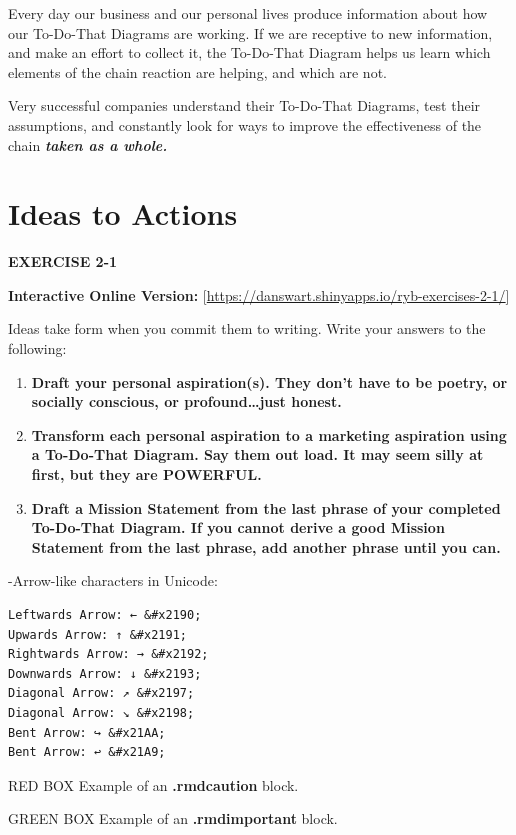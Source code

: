 \documentclass[
]{book}
\begin{document}
Every day our business and our personal lives produce information about how our To-Do-That Diagrams are working. If we are receptive to new information, and make an effort to collect it, the To-Do-That Diagram helps us learn which elements of the chain reaction are helping, and which are not.

Very successful companies understand their To-Do-That Diagrams, test their assumptions, and constantly look for ways to improve the effectiveness of the chain \textbf{\emph{taken as a whole.}}

\hypertarget{ideas-to-actions-1}{%
\section{Ideas to Actions}\label{ideas-to-actions-1}}

\textbf{EXERCISE 2-1}

{\textbf{Interactive Online Version:}} {[}\url{https://danswart.shinyapps.io/ryb-exercises-2-1/}{]}

Ideas take form when you commit them to writing. Write your answers to the following:

\begin{enumerate}
\def\labelenumi{\arabic{enumi}.}
\item
  \textbf{Draft your personal aspiration(s). They don't have to be poetry, or socially conscious, or profound\ldots just honest.}
\item
  \textbf{Transform each personal aspiration to a marketing aspiration using a To-Do-That Diagram. Say them out load. It may seem silly at first, but they are POWERFUL.}
\item
  \textbf{Draft a Mission Statement from the last phrase of your completed To-Do-That Diagram. If you cannot derive a good Mission Statement from the last phrase, add another phrase until you can.}
\end{enumerate}

-Arrow-like characters in Unicode:

\begin{verbatim}
Leftwards Arrow: ← &#x2190;
Upwards Arrow: ↑ &#x2191;
Rightwards Arrow: → &#x2192;
Downwards Arrow: ↓ &#x2193;
Diagonal Arrow: ↗ &#x2197;
Diagonal Arrow: ↘ &#x2198;
Bent Arrow: ↪ &#x21AA;
Bent Arrow: ↩ &#x21A9;
\end{verbatim}

RED BOX Example of an \textbf{.rmdcaution} block.

GREEN BOX Example of an \textbf{.rmdimportant} block.
\end{document}
